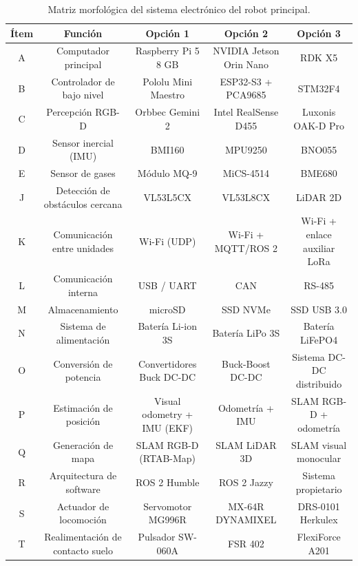 \begin{table}[htbp]
\centering
\small
\renewcommand{\arraystretch}{1.3} %
\setlength{\tabcolsep}{5pt}       %

\begin{tabularx}{\textwidth}{|c|C|C|C|C|}
\hline
\textbf{Ítem} & \textbf{Función} & \textbf{Opción 1} & \textbf{Opción 2} & \textbf{Opción 3} \\
\hline
A & Computador principal & Raspberry Pi 5 8 GB & NVIDIA Jetson Orin Nano & RDK X5 \\
\hline
B & Controlador de bajo nivel & Pololu Mini Maestro & ESP32-S3 + PCA9685 & STM32F4 \\
\hline
C & Percepción RGB-D & Orbbec Gemini 2 & Intel RealSense D455 & Luxonis OAK-D Pro \\
\hline
D & Sensor inercial (IMU) & BMI160 & MPU9250 & BNO055 \\
\hline
E & Sensor de gases & Módulo MQ-9 & MiCS-4514 & BME680 \\
\hline
J & Detección de obstáculos cercana & VL53L5CX & VL53L8CX & LiDAR 2D \\
\hline
K & Comunicación entre unidades & Wi-Fi (UDP) & Wi-Fi + MQTT/ROS 2 & Wi-Fi + enlace auxiliar LoRa \\
\hline
L & Comunicación interna & USB / UART & CAN & RS-485 \\
\hline
M & Almacenamiento & microSD & SSD NVMe & SSD USB 3.0 \\
\hline
N & Sistema de alimentación & Batería Li-ion 3S & Batería LiPo 3S & Batería LiFePO4 \\
\hline
O & Conversión de potencia & Convertidores Buck DC-DC & Buck-Boost DC-DC & Sistema DC-DC distribuido \\
\hline
P & Estimación de posición & Visual odometry + IMU (EKF) & Odometría + IMU & SLAM RGB-D + odometría \\
\hline
Q & Generación de mapa & SLAM RGB-D (RTAB-Map) & SLAM LiDAR 3D & SLAM visual monocular \\
\hline
R & Arquitectura de software & ROS 2 Humble & ROS 2 Jazzy & Sistema propietario \\
\hline
S & Actuador de locomoción & Servomotor MG996R & MX-64R DYNAMIXEL & DRS-0101 Herkulex \\
\hline
T & Realimentación de contacto suelo & Pulsador SW-060A & FSR 402 & FlexiForce A201 \\
\hline
\end{tabularx}
\caption{Matriz morfológica del sistema electrónico del robot principal.}
\label{tab:matriz_morfologica_principal}
\end{table}


